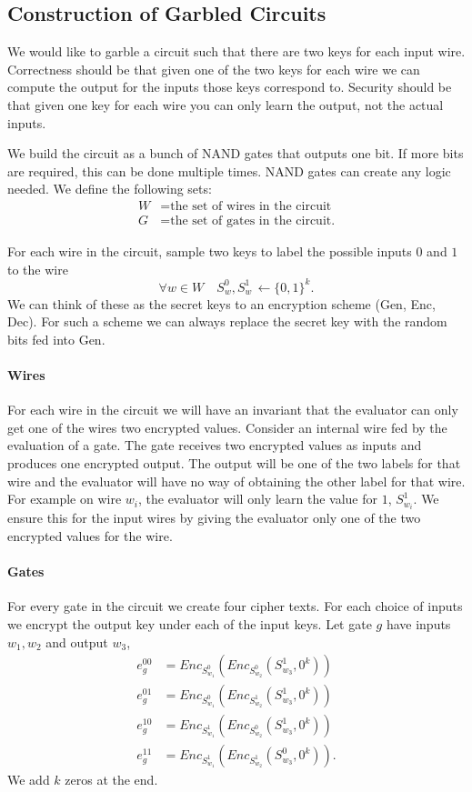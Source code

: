 \documentclass[11pt]{article}
\newcommand{\Enc}{\ensuremath{Enc}\xspace}
\begin{document}
\subsection{Construction of Garbled Circuits}

We would like to garble a circuit such that there are two keys for each input wire.
Correctness should be that 
given one of the two keys for each wire we can compute the output for the inputs those keys correspond to.
Security should be that 
given one key for each wire you can only learn the output, not the actual inputs.


We build the circuit as a bunch of NAND gates that outputs one bit. 
If more bits are required, this can be done multiple times.
NAND gates can create any logic needed. 
We define the following sets:
\begin{align*}
W &= \text{the set of wires in the circuit}\\
G &= \text{the set of gates in the circuit.}
\end{align*}

For  each wire in the circuit, sample two keys
to label the possible inputs $0$ and $1$  to the wire
\[
\forall w \in W  \quad S_w^0, S_w^1 \,  \leftarrow{} \{0,1\}^k.
\]
We can think of these as the secret keys to an encryption scheme
(Gen, Enc, Dec).
For such a scheme we can always replace the secret key with the random bits fed into Gen.


\paragraph{Wires}
For each wire in the circuit we will have an invariant that the evaluator can only get one of the wires two encrypted values.
Consider an internal wire fed by the evaluation of a gate. The gate receives two encrypted values as inputs
and produces one encrypted output. The output will be one of the two labels for that wire and the evaluator will have no 
way of obtaining the other label for that wire. 
For example on wire $w_i$, the evaluator will only learn the value for $1$,  $S_{w_i}^1$.
We ensure this for the input wires by giving the evaluator only one of the two encrypted values for the wire.

\paragraph{Gates}
For every gate in the circuit we create four cipher texts. 
For each choice of inputs we encrypt the output key under each of the input keys. 
Let gate $g$ have inputs $w_1, w_2$ and output $w_3$,
\begin{align*}
e_g^{00} &= \Enc_{S_{w_1}^0} ( \Enc_{S_{w_2}^0}  ( S_{w_3}^1, 0^k) )\\
e_g^{01} &= \Enc_{S_{w_1}^0} ( \Enc_{S_{w_2}^1}  ( S_{w_3}^1, 0^k) )\\
e_g^{10} &= \Enc_{S_{w_1}^1} ( \Enc_{S_{w_2}^0}  ( S_{w_3}^1, 0^k) )\\
e_g^{11} &= \Enc_{S_{w_1}^1} ( \Enc_{S_{w_2}^1}  ( S_{w_3}^0, 0^k) ).
\end{align*}
We add $k$ zeros at the end.
\end{document}
